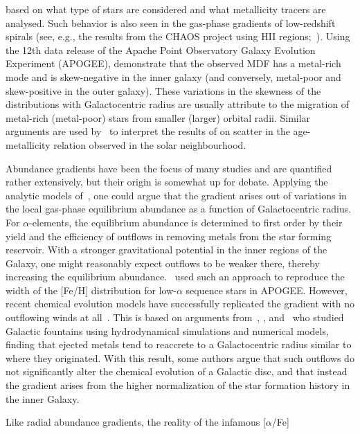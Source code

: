 \documentclass[fleqn, usenatbib]{mnras}
\begin{document}
based on what type of stars are considered and what metallicity tracers are 
analysed. Such behavior is also seen in the gas-phase gradients of 
low-redshift spirals (see, e.g., the results from the CHAOS project using HII 
regions;~\citealp{Berg2015, Berg2020}). Using the 12th data release of the 
Apache Point Observatory Galaxy Evolution Experiment (APOGEE), 
\citet{Hayden2015} demonstrate that the observed MDF has a metal-rich mode and 
is skew-negative in the inner galaxy (and conversely, metal-poor and 
skew-positive in the outer galaxy). These variations in the skewness of the 
distributions with Galactocentric radius are usually attribute to the migration 
of metal-rich (metal-poor) stars from smaller (larger) orbital radii. Similar 
arguments are used by~\citet{Sellwood2002} to interpret the results of 
\citet{Edvardsson1993} on scatter in the age-metallicity relation observed in 
the solar neighbourhood. 
\par 
Abundance gradients have been the focus of many studies and are quantified 
rather extensively, but their origin is somewhat up for debate. Applying the 
analytic models of~\citet*{Weinberg2017}, one could argue that the gradient 
arises out of variations in the local gas-phase equilibrium abundance as a 
function of Galactocentric radius. For $\alpha$-elements, the equilibrium 
abundance is determined to first order by their yield and the efficiency of 
outflows in removing metals from the star forming reservoir. With a stronger 
gravitational potential in the inner regions of the Galaxy, one might 
reasonably expect outflows to be weaker there, thereby increasing the 
equilibrium abundance.~\citet{Nidever2014} used such an approach to reproduce 
the width of the [Fe/H] distribution for low-$\alpha$ sequence stars in 
APOGEE. However, recent chemical evolution models have successfully replicated 
the gradient with no outflowing winds at all~\citep[e.g.][]{Minchev2013, 
Spitoni2019a}. This is based on arguments from~\citet{Melioli2008, Melioli2009}, 
\citet*{Spitoni2008}, and~\citet{Spitoni2009} who studied Galactic fountains 
using hydrodynamical simulations and numerical models, finding that ejected 
metals tend to reaccrete to a Galactocentric radius similar to where they 
originated. With this result, some authors argue that such outflows do not 
significantly alter the chemical evolution of a Galactic disc, and that instead 
the gradient arises from the higher normalization of the star formation history 
in the inner Galaxy. 
\par 
Like radial abundance gradients, the reality of the infamous [$\alpha$/Fe] 
\end{document}
